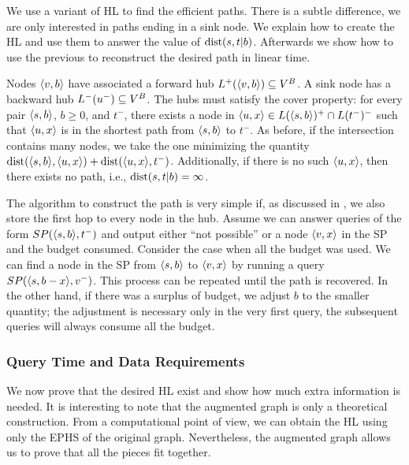 We use a variant of HL to find the efficient paths.
There is a subtle difference, we are only interested in paths ending in a sink node.
We explain how to create the HL and use them to answer the value of $\text{dist}(s,t|b)$.
Afterwards we show how to use the previous to reconstruct the desired path in linear time.

Nodes $\langle v,b\rangle$ have associated a forward hub $L^+(\langle v,b\rangle)\subseteq V^B$.
A sink node has a backward hub $L^-(u^-)\subseteq V^B$.
The hubs must satisfy the cover property: for every pair $\langle s,b\rangle$, $b\geq 0$, and $t^-$, there exists a node in $\langle u,x\rangle\in L(\langle s,b\rangle)^+\cap L(t^-)^-$ such that $\langle u,x\rangle$ is in the shortest path from $\langle s,b\rangle$ to $t^-$.
As before, if the intersection contains many nodes, we take the one minimizing the quantity $\text{dist}(\langle s,b\rangle,\langle u,x\rangle)+\text{dist}(\langle u,x\rangle,t^-)$.
Additionally, if there is no such $\langle u,x\rangle$, then there exists no path, i.e., $\text{dist}(s,t|b)=\infty$.

The algorithm to construct the path is very simple if, as discussed in , we also store the first hop to every node in the hub.
Assume we can answer queries of the form $SP(\langle s,b\rangle,t^-)$ and output either ``not possible'' or a node $\langle v,x\rangle$ in the SP and the budget consumed.
Consider the case when all the budget was used.
We can find a node in the SP from $\langle s,b\rangle$ to $\langle v,x\rangle$ by running a query $SP(\langle s,b-x\rangle,v^-)$.
This process can be repeated until the path is recovered.
In the other hand, if there was a surplus of budget, we adjust $b$ to the smaller quantity; the adjustment is necessary only in the very first query, the subsequent queries will always consume all the budget.

\subsubsection{Query Time and Data Requirements}
We now prove that the desired HL exist and show how much extra information is needed.
It is interesting to note that the augmented graph is only a theoretical construction.
From a computational point of view, we can obtain the HL using only the EPHS of the original graph.
Nevertheless, the augmented graph allows us to prove that all the pieces fit together.

